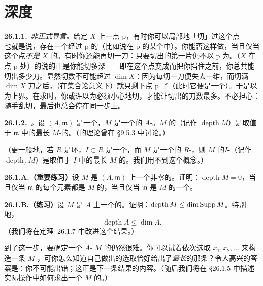 
\section{深度}

\textbf{26.1.1.}\ \emph{非正式导言。}\quad 给定\trScheme{} $X$ 上一点 $\mathrm{p}$，有时你可以局部地「切」过这个点——也就是说，存在一个经过 $\mathrm{p}$ 的\trEffectiveCartierDivisor（比如说在 $\mathrm{p}$ 的某个\trNeighborhood 中）。你能否这样做，当且仅当这个点\emph{不是} $X$ 的\trAssociatedPoint。有时你还能再切一刀：只要切出的第一片仍不以 $\mathrm{p}$ 为\trAssociatedPoint。（$X$ 在点 $\mathrm{p}$ 处）的\trDepth{}说的正是你能切多深——即在这个点变成\trAssociatedPoint{}而把你挡住之前，你总共能切出多少刀。显然切数不可能超过 $\dim X$：因为每切一刀便失去一维，而切满 $\dim X$ 刀之后，（在集合论意义下）就只剩下点 $\mathrm{p}$ 了（此时它便是一个\trAssociatedPoint）。于是\trDepth{}以\trDimension{}为上界。在求\trDepth{}时，你或许以为必须小心地切，才能让切出的刀数最多。不必担心：随手乱切，最后也总会停在同一步上。

\textbf{26.1.2.}\ \emph{\trhDefinition。}\quad 设 $(A,\mathfrak{m})$ 是一个\trNoetherian\trLocalRing，$M$ 是一个\trFinitelyGenerated{}的 $A$-\trModule。$M$ 的\textbf{\trDepth}（记作 $\operatorname{depth}M$）是取值于 $\mathfrak{m}$ 中的最长 $M$-\trRegularSequence{}的\trLength。（\trRegularSequence{}的理论曾在 \S9.5.3 中讨论。）

（更一般地，若 $R$ 是\trNoetherian{}环，$I\subset R$ 是一个\trIdeal，而 $M$ 是一个\trFinitelyGenerated{}的 $R$-\trModule，则 $M$ 的\textbf{$I$-\trDepth}（记作 $\operatorname{depth}_I M$）是取值于 $I$ 中的最长 $M$-\trRegularSequence{}的\trLength。我们用不到这个概念。）

\textbf{26.1.A.（重要练习）}\quad 设 $M$ 是\trNoetherian\trLocalRing{} $(A,\mathfrak{m})$ 上一个非零\trFinitelyGenerated{}的\trModule。证明：$\operatorname{depth}M=0$，当且仅当 $\mathfrak{m}$ 的每个元素都是 $M$ 的\trZerodivisor，当且仅当 $\mathfrak{m}$ 是 $M$ 的一个\trAssociatedPrimeIdeal。

\textbf{26.1.B.（练习）}\quad 设 $M$ 是\trNoetherian\trLocalRing{} $A$ 上一个\trFinitelyGenerated{}的\trModule。证明：$\operatorname{depth}M\le\dim\operatorname{Supp} M$。特别地，
\[
\tag{26.1.2.1}\label{eq:depth-le-dim}
\operatorname{depth}A\le\dim A.
\]
（我们将在\mbox{定理~26.1.7} 中改进这个结果。）

到了这一步，要确定一个 $A$-\trModule{} $M$ 的\trDepth{}仍然很难。你可以试着依次选取 $x_1,x_2,\dots$ 来构造一条 $M$-\trRegularSequence，可你怎么知道自己做出的选取恰好给出了\emph{最长}的那条？令人高兴的答案是：你不可能出错；这正是下一条结果的内容。（随后我们将在 \S26.1.5 中描述实际操作中如何求出一个\trModule{} $M$ 的\trDepth。）

